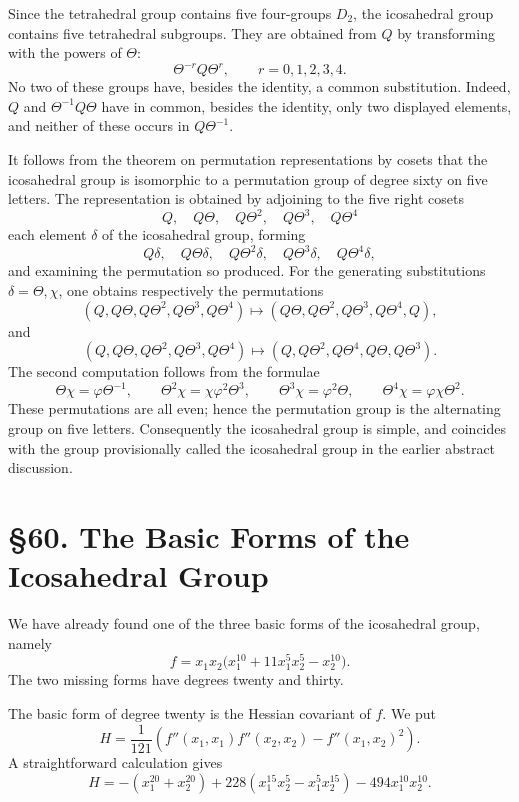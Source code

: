 \documentclass[11pt,a4paper]{book}
\newcommand{\webersection}[2]{\clearpage\section*{\S #1. #2}}
\begin{document}
Since the tetrahedral group contains five four-groups \(D_2\), the icosahedral group contains five tetrahedral subgroups.  They are obtained from \(Q\) by transforming with the powers of \(\Theta\):
\[
 \Theta^{-r}Q\Theta^r,
 \qquad r=0,1,2,3,4.
\]
No two of these groups have, besides the identity, a common substitution.  Indeed, \(Q\) and \(\Theta^{-1}Q\Theta\) have in common, besides the identity, only two displayed elements, and neither of these occurs in \(Q\Theta^{-1}\).

It follows from the theorem on permutation representations by cosets that the icosahedral group is isomorphic to a permutation group of degree sixty on five letters.  The representation is obtained by adjoining to the five right cosets
\[
 Q,
 \quad Q\Theta,
 \quad Q\Theta^2,
 \quad Q\Theta^3,
 \quad Q\Theta^4
\]
each element \(\delta\) of the icosahedral group, forming
\[
 Q\delta,
 \quad Q\Theta\delta,
 \quad Q\Theta^2\delta,
 \quad Q\Theta^3\delta,
 \quad Q\Theta^4\delta,
\]
and examining the permutation so produced.  For the generating substitutions \(\delta=\Theta,\chi\), one obtains respectively the permutations
\[
 (Q,Q\Theta,Q\Theta^2,Q\Theta^3,Q\Theta^4)
  \mapsto
 (Q\Theta,Q\Theta^2,Q\Theta^3,Q\Theta^4,Q),
\]
and
\[
 (Q,Q\Theta,Q\Theta^2,Q\Theta^3,Q\Theta^4)
  \mapsto
 (Q,Q\Theta^2,Q\Theta^4,Q\Theta,Q\Theta^3).
\]
The second computation follows from the formulae
\[
 \Theta\chi=\varphi\Theta^{-1},
 \qquad
 \Theta^2\chi=\chi\varphi^2\Theta^3,
 \qquad
 \Theta^3\chi=\varphi^2\Theta,
 \qquad
 \Theta^4\chi=\varphi\chi\Theta^2.
\]
These permutations are all even; hence the permutation group is the alternating group on five letters.  Consequently the icosahedral group is simple, and coincides with the group provisionally called the icosahedral group in the earlier abstract discussion.

\webersection{60}{The Basic Forms of the Icosahedral Group}

We have already found one of the three basic forms of the icosahedral group, namely
\begin{equation}\label{eq:60-1}
 f=x_1x_2\bigl(x_1^{10}+11x_1^5x_2^5-x_2^{10}\bigr).
\end{equation}
The two missing forms have degrees twenty and thirty.

The basic form of degree twenty is the Hessian covariant of \(f\).  We put
\begin{equation}\label{eq:60-2}
 H=\frac1{121}\left(f''(x_1,x_1)f''(x_2,x_2)-f''(x_1,x_2)^2\right).
\end{equation}
A straightforward calculation gives
\begin{equation}\label{eq:60-3}
 H=-(x_1^{20}+x_2^{20})+228(x_1^{15}x_2^5-x_1^5x_2^{15})-494x_1^{10}x_2^{10}.
\end{equation}
\end{document}
